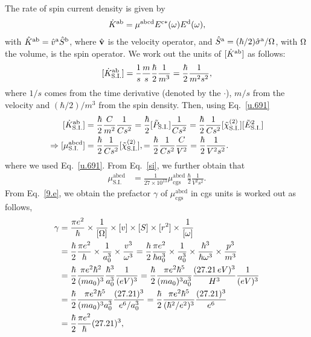 \documentclass[floatfix,prb,aps,superscriptaddress,11pt]{revtex4}
\begin{document}
The rate of spin current density is given by
\begin{align}\label{e.0}
\dot K^{\mathrm{a}\mathrm{b}}
=\mu^{\mathrm{abcd}}
E^{\mathrm{c}*}(\omega) E^{\mathrm{d}}(\omega)  
,
\end{align} 
with $\hat K^{\mathrm{a}\mathrm{b}}=\hat v^{\mathrm{a}} \hat S^{\mathrm{b}}$, where $\hat {\mathbf{v}}$ is
the velocity operator, and
$\hat S^{\mathrm{a}}=(\hbar/2)\hat{\sigma}^{\mathrm{a}}/\Omega$, with $\Omega$ the volume, is the
spin operator. We work out the
units of $[\dot K^{\mathrm{a}\mathrm{b}}]$ as follows:
\begin{align}\label{e.1}
[\dot K^{\mathrm{a}\mathrm{b}}_{\mathrm{S.I.}}]
=\frac{1}{s}\frac{m}{s}\frac{\hbar}{2} \frac{1}{m^3}
=\frac{\hbar}{2} \frac{1}{m^2s^2}
,
\end{align} 
where $1/s$ comes from the time derivative (denoted by the $\cdot$), $m/s$
from the velocity and $(\hbar/2)/m^3$ from the spin density. Then,
using Eq.~\eqref{u.691}
\begin{align}\label{e.2}
[\dot K^{\mathrm{a}\mathrm{b}}_{\mathrm{S.I.}}]
&=\frac{\hbar}{2} \frac{C}{m^2}\frac{1}{Cs^2}
=\frac{\hbar}{2} [\tilde P _{\mathrm{S.I.}}]\frac{1}{Cs^2}
=\frac{\hbar}{2} \frac{1}{Cs^2}[\tilde \chi^{(2)}_{\mathrm{S.I.}}]
[\tilde E^2 _{\mathrm{S.I.}}]
\nonumber\\
\Rightarrow[\mu^{\mathrm{abcd}}_{\mathrm{S.I.}}]&=
\frac{\hbar}{2} \frac{1}{Cs^2}[\tilde \chi^{(2)}_{\mathrm{S.I.}}],
=
\frac{\hbar}{2} \frac{1}{Cs^2}\frac{C}{V^2}
=
\frac{\hbar}{2} \frac{1}{V^2s^2}.  
\end{align} 
where we used Eq.~\eqref{u.691}. From Eq.~\eqref{si}, we further
obtain that
\begin{align}\label{e.3}
\mu^{\mathrm{abcd}}_{\mathrm{S.I.}}&=
\frac{1}{27\times 10^{13}}
\mu^{\mathrm{abcd}}_{\mathrm{cgs}}
\,\frac{\hbar}{2} \frac{1}{V^2s^2}. 
\end{align}  
From 
Eq.~\eqref{9.e}, we obtain the prefactor $\gamma$ of
$\mu^{\mathrm{abcd}}_{\mathrm{cgs}}$ in
 cgs  units is worked out as follows, 
\begin{align}\label{e.4}
\gamma
&=\frac{\pi e^2}{\hbar}\times\frac{1}{[\Omega]}\times [v] \times [S] 
  \times [r^2] \times \frac{1}{[\omega]}
\nonumber\\
&=\frac{\hbar}{2}\frac{\pi e^2}{\hbar}\times\frac{1}{a^3_0}\times 
\frac{v^3}{\omega^3}
=\frac{\hbar}{2}\frac{\pi e^2}{\hbar a^3_0}\times\frac{1}{a^3_0}\times 
\frac{\hbar^3}{\hbar\omega^3}
\times 
\frac{p^3}{m^3}
\nonumber\\
&
=\frac{\hbar}{2}\frac{\pi e^2\hbar^2}{(m a_0)^3}\frac{\hbar^3}{a^3_0}
\frac{1}{(eV)^3}
=\frac{\hbar}{2}\frac{\pi e^2\hbar^5}{(m a_0)^3a^3_0}
\frac{(27.21\,eV)^3}{H^3}
\frac{1}{(eV)^3}
\nonumber\\
&
=\frac{\hbar}{2}\frac{\pi e^2\hbar^5}{(m a_0)^3a^3_0}
\frac{(27.21)^3}{e^6/a^3_0}
=\frac{\hbar}{2}\frac{\pi e^2\hbar^5}{(\hbar^2/e^2)^3}
\frac{(27.21)^3}{e^6}
\nonumber\\
&
=\frac{\hbar}{2}
\frac{\pi e^2}{\hbar}(27.21)^3 
,
\end{align} 
\end{document}
